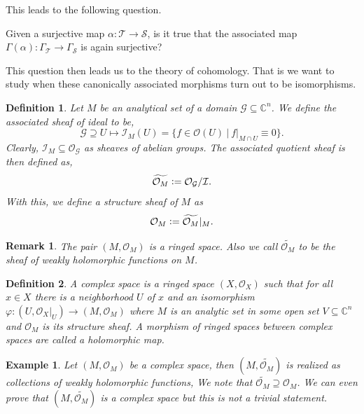 \documentclass{article}
\newtheorem{definition}{Definition}[section]
\newtheorem{remark}{Remark}[section]
\newtheorem{example}{Example}[section]
\newcommand{\defeq}{\vcentcolon=}
\newcommand{\cS}[0]{\mathcal{S}}
\newcommand{\cT}[0]{\mathcal{T}}
\newcommand{\cI}[0]{\mathcal{I}}
\newcommand{\C}[0]{\mathbb{C}}
\newcommand{\G}[0]{\mathcal{G}}
\newcommand{\sep}[0]{\:|\:}
\newcommand{\Ouv}[0]{\mathcal{O}}
\begin{document}
This leads to the following question. 
\par Given a surjective map $\alpha:\mathcal{T}\to\mathcal{S}$, is it true that the associated map $\Gamma(\alpha):\Gamma_\cT\to\Gamma_\cS$ is again surjective?
\par This question then leads us to the theory of cohomology. That is we want to study when these canonically associated morphisms turn out to be isomorphisms.

\begin{definition}
  Let $M$ be an analytical set of a domain $\G\subseteq\C^n$. We define the associated sheaf of ideal to be,
  \begin{equation*}
    \G\supseteq U\mapsto \mathcal{I}_M(U) = \{f\in\Ouv(U)\sep f|_{M\cap U} \equiv 0\}.
  \end{equation*}
  Clearly, $\cI_M\subseteq\Ouv_\G$ as sheaves of abelian groups. The associated quotient sheaf is then defined as,
  \begin{equation*}
    \widetilde{\Ouv_M}\defeq\Ouv_\G/\cI.
  \end{equation*}
  With this, we define a structure sheaf of $M$ as
  \begin{equation*}
    \Ouv_M\defeq \widetilde{\Ouv_M}|_M.
  \end{equation*}
\end{definition}

\begin{remark}
  The pair $(M,\Ouv_M)$ is a ringed space. Also we call $\widetilde{\Ouv_M}$ to be the sheaf of weakly holomorphic functions on $M$.
\end{remark}

\begin{definition}
  A complex space is a ringed space $(X,\Ouv_X)$ such that for all $x\in X$ there is a neighborhood $U$ of $x$ and an isomorphism $\varphi:(U,\Ouv_X|_U)\to (M,\Ouv_M)$
   where $M$ is an analytic set in some open set $V\subseteq\C^n$ and $\Ouv_M$ is its structure sheaf. A morphism of ringed spaces between complex spaces are called a holomorphic map.
\end{definition}

\begin{example}
  Let $(M,\Ouv_M)$ be a complex space, then $(M,\widetilde{\Ouv_M})$ is realized as collections of weakly holomorphic functions, We note that $\widetilde{\Ouv_M}\supseteq \Ouv_M$. We can even prove that $(M,\widetilde{\Ouv_M})$ is a complex space but this is not a trivial statement.
\end{example}
\end{document}
